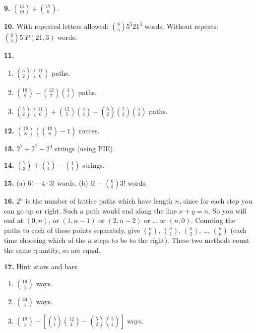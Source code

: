 \documentclass[10pt,]{book}
\theoremstyle{plain}
\theoremstyle{definition}
\theoremstyle{definition}
\theoremstyle{definition}
\numberwithin{equation}{section}
\begin{document}
\par\smallskip
\noindent\textbf{9.}\quad{}
            \({13 \choose 10} + {17 \choose 8}\).
\par\smallskip
\noindent\textbf{10.}\quad{}
            With repeated letters allowed: \({8 \choose 5}5^5 21^3\) words. Without repeats: \({8 \choose 5}5! P(21, 3)\) words.
\par\smallskip
\noindent\textbf{11.}\quad{}
            \leavevmode%
\begin{enumerate}[label=(\alph*)]
\item\hypertarget{li-744}{}\({5 \choose 2}{11 \choose 6}\) paths.%
\item\hypertarget{li-745}{}\({16 \choose 8} - {12 \choose 7}{4 \choose 1}\) paths.%
\item\hypertarget{li-746}{}\({5 \choose 2}{11 \choose 6} + {12 \choose 5}{4 \choose 3} - {5 \choose 2}{7 \choose 3}{4 \choose 3}\) paths.%
\end{enumerate}

\par\smallskip
\noindent\textbf{12.}\quad{}
            \({18 \choose 8}\left({18 \choose 8} - 1\right)\) routes.
\par\smallskip
\noindent\textbf{13.}\quad{}
            \(2^7 + 2^7 - 2^4\) strings (using PIE).
\par\smallskip
\noindent\textbf{14.}\quad{}
            \({7 \choose 3} + {7 \choose 4} - {4 \choose 1}\) strings.
\par\smallskip
\noindent\textbf{15.}\quad{}
            (a) \(6! - 4\cdot 3!\) words. (b) \(6! - {6 \choose 3}3!\) words.
\par\smallskip
\noindent\textbf{16.}\quad{}
            \(2^n\) is the number of lattice paths which have length \(n\), since for each step you can go up or right. Such a path would end along the line \(x + y = n\). So you will end at \((0,n)\), or \((1,n-1)\) or \((2, n-2)\) or
            \dots{} or \((n,0)\). Counting the paths to each of these points separately, give \({n \choose 0}\), \({n \choose 1}\), \({n \choose 2}\),
            \dots{}, \({n \choose n}\) (each time choosing which of the \(n\) steps to be to the right).  These two methods count the same quantity, so are equal.
\par\smallskip
\noindent\textbf{17.}\quad{}
            Hint: stars and bars.
          \leavevmode%
\begin{enumerate}[label=(\alph*)]
\item\hypertarget{li-750}{}\({19 \choose 4}\) ways.%
\item\hypertarget{li-751}{}\({24 \choose 4}\) ways.%
\item\hypertarget{li-752}{}\({19 \choose 4} - \left[{5 \choose 1}{12 \choose 4} - {5 \choose 2}{5 \choose 4}  \right]\) ways.%
\end{enumerate}
\end{document}
